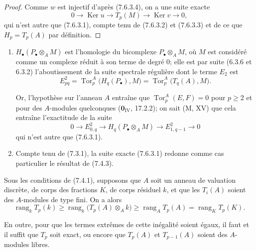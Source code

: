 \begin{proof}
Comme $w$ est injectif d'après (7.6.3.4), on a une suite exacte
\[
  0\longrightarrow\operatorname{Ker}u
  \longrightarrow T_p(M)
  \longrightarrow\operatorname{Ker}v
  \longrightarrow0,
\]
qui n'est autre que (7.6.3.1), compte tenu de (7.6.3.2) et (7.6.3.3) et de ce
que $H_p=T_p(A)$ par définition.
\end{proof}

\begin{remarks}[7.6.4]
\begin{enumerate}
  \item[(i)] $H_\bullet(P_\bullet\otimes_A M)$ est l'homologie du bicomplexe
    $P_\bullet\otimes_A M$, où $M$ est considéré comme un complexe réduit à son
    terme de degré 0; elle est par suite (6.3.6 et 6.3.2) l'aboutissement de la
    suite spectrale régulière dont le terme $E_2$ est
    \[
      E^2_{pq}
      =
      \operatorname{Tor}_p^A\bigl(H_q(P_\bullet),M\bigr)
      =
      \operatorname{Tor}_p^A\bigl(T_q(A),M\bigr).
    \]

    Or, l'hypothèse sur l'anneau $A$ entraîne que
    $\operatorname{Tor}_p^A(E,F)=0$ pour $p\geq2$ et pour des $A$-modules
    quelconques ($\mathbf{0}_{\mathrm{IV}}$, 17.2.2); on sait (M, XV) que cela entraîne
    l'exactitude de la suite
    \[
      0\longrightarrow E^2_{0,q}
      \longrightarrow H_q(P_\bullet\otimes_A M)
      \longrightarrow E^2_{1,q-1}
      \longrightarrow0
    \]
    qui n'est autre que (7.6.3.1).
  \item[(ii)] Compte tenu de (7.3.1), la suite exacte (7.6.3.1) redonne comme
    cas particulier le résultat de (7.4.3).
\end{enumerate}
\end{remarks}

\begin{corollary}[7.6.5]
Sous les conditions de \textup{(7.4.1)}, supposons que $A$ soit un anneau de valuation
discrète, de corps des fractions $K$, de corps résiduel $k$, et que les $T_i(A)$
soient des $A$-modules de type fini. On a alors
\[
  \operatorname{rang}_k T_p(k)
  \geq
  \operatorname{rang}_k\bigl(T_p(A)\otimes_A k\bigr)
  \geq
  \operatorname{rang}_A T_p(A)
  =
  \operatorname{rang}_K T_p(K).
  \tag{7.6.5.1}\label{III.7.6.5.1.fr}
\]

En outre, pour que les termes extrêmes de cette inégalité soient égaux, il faut
et il suffit que $T_p$ soit exact, ou encore que $T_p(A)$ et $T_{p-1}(A)$ soient
des $A$-modules libres.
\end{corollary}


